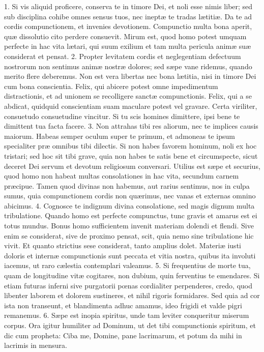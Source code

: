 1. Si vis aliquid proficere, conserva te in timore Dei, et noli esse nimis liber; sed sub disciplina cohibe omnes sensus tuos, nec ineptæ te tradas lætitiæ. Da te ad cordis compunctionem, et invenies devotionem. Compunctio multa bona aperit, quæ dissolutio cito perdere consuevit. Mirum est, quod homo potest umquam perfecte in hac vita lætari, qui suum exilium et tam multa pericula animæ suæ considerat et pensat.
2. Propter levitatem cordis et neglegentiam defectuum nostrorum non sentimus animæ nostræ dolores; sed sæpe vane ridemus, quando merito flere deberemus. Non est vera libertas nec bona lætitia, nisi in timore Dei cum bona conscientia. Felix, qui abicere potest omne impedimentum distractionis, et ad unionem se recolligere sanctæ compunctionis. Felix, qui a se abdicat, quidquid conscientiam suam maculare potest vel gravare. Certa viriliter, consuetudo consuetudine vincitur. Si tu scis homines dimittere, ipsi bene te dimittent tua facta facere.
3. Non attrahas tibi res aliorum, nec te implices causis maiorum. Habeas semper oculum super te primum, et admoneas te ipsum specialiter præ omnibus tibi dilectis. Si non habes favorem hominum, noli ex hoc tristari; sed hoc sit tibi grave, quia non habes te satis bene et circumspecte, sicut deceret Dei servum et devotum religiosum conversari. Utilius est sæpe et securius, quod homo non habeat multas consolationes in hac vita, secundum carnem præcipue. Tamen quod divinas non habemus, aut rarius sentimus, nos in culpa sumus, quia compunctionem cordis non quærimus, nec vanas et externas omnino abicimus.
4. Cognosce te indignum divina consolatione, sed magis dignum multa tribulatione. Quando homo est perfecte compunctus, tunc gravis et amarus est ei totus mundus. Bonus homo sufficientem invenit materiam dolendi et flendi. Sive enim se considerat, sive de proximo pensat, scit, quia nemo sine tribulatione hic vivit. Et quanto strictius sese considerat, tanto amplius dolet. Materiæ iusti doloris et internæ compunctionis sunt peccata et vitia nostra, quibus ita involuti iacemus, ut raro cælestia contemplari valeamus.
5. Si frequentius de morte tua, quam de longitudine vitæ cogitares, non dubium, quin ferventius te emendares. Si etiam futuras inferni sive purgatorii pœnas cordialiter perpenderes, credo, quod libenter laborem et dolorem sustineres, et nihil rigoris formidares. Sed quia ad cor ista non transeunt, et blandimenta adhuc amamus, ideo frigidi et valde pigri remanemus.
6. Sæpe est inopia spiritus, unde tam leviter conqueritur miserum corpus. Ora igitur humiliter ad Dominum, ut det tibi compunctionis spiritum, et dic cum propheta: Ciba me, Domine, pane lacrimarum, et potum da mihi in lacrimis in mensura.


